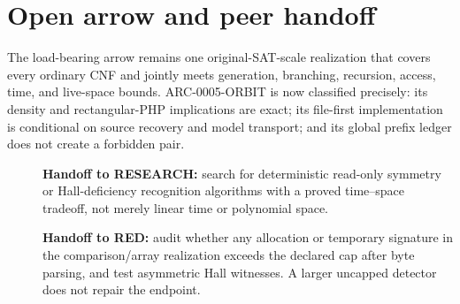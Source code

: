\documentclass[11pt]{article}
\begin{document}
\section{Open arrow and peer handoff}
The load-bearing arrow remains one original-SAT-scale realization that covers
every ordinary CNF and jointly meets generation, branching, recursion,
access, time, and live-space bounds.  ARC-0005-ORBIT is now classified
precisely: its density and rectangular-PHP implications are exact; its
file-first implementation is conditional on source recovery and model
transport; and its global prefix ledger does not create a forbidden pair.

\begin{description}
\item[] \textbf{Handoff to RESEARCH:} search for deterministic read-only
symmetry or Hall-deficiency recognition algorithms with a proved
time--space tradeoff, not merely linear time or polynomial space.
\item[] \textbf{Handoff to RED:} audit whether any allocation or temporary
signature in the comparison/array realization exceeds the declared cap after
byte parsing, and test asymmetric Hall witnesses.  A larger uncapped detector
does not repair the endpoint.
\end{description}



\end{document}
